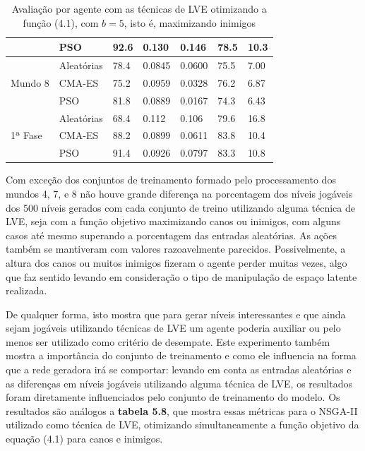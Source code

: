 \begin{table}[ht]
\begin{tabular}{|p{2cm}|p{2cm}|p{2cm}|p{2cm}|p{2cm}|p{1cm}|p{2cm}|}
        & PSO & 92.6 & 0.130 & 0.146 & 78.5 & 10.3 \\
            \hline
        &Aleatórias & 78.4 & 0.0845 & 0.0600 & 75.5 & 7.00 \\
        Mundo 8 & CMA-ES & 75.2 & 0.0959 & 0.0328 & 76.2 & 6.87 \\
        & PSO & 81.8 & 0.0889 & 0.0167 & 74.3 & 6.43 \\
            \hline
        & Aleatórias & 68.4 & 0.112 & 0.106 & 79.6 & 16.8 \\
        1ª Fase & CMA-ES & 88.2 & 0.0899 & 0.0611 & 83.8 & 10.4 \\
         & PSO & 91.4 & 0.0926 & 0.0797 & 83.3 & 10.8 \\
            \hline
    \end{tabular}
    \caption{Avaliação por agente com as técnicas de LVE otimizando a função (4.1), com $b = 5$, isto é, maximizando inimigos}
    \label{tab:inimigos_}
\end{table}

Com exceção dos conjuntos de treinamento formado pelo processamento dos mundos 4, 7, e 8 não houve grande diferença na porcentagem dos níveis jogáveis dos 500 níveis gerados com cada conjunto de treino utilizando alguma técnica de LVE, seja com a função objetivo maximizando canos ou inimigos, com alguns casos até mesmo superando a porcentagem das entradas aleatórias. As ações também se mantiveram com valores razoavelmente parecidos. Possivelmente, a altura dos canos ou muitos inimigos fizeram o agente perder muitas vezes, algo que faz sentido levando em consideração o tipo de manipulação de espaço latente realizada.

De qualquer forma, isto mostra que para gerar níveis interessantes e que ainda sejam jogáveis utilizando técnicas de LVE um agente poderia auxiliar ou pelo menos ser utilizado como critério de desempate. Este experimento também mostra a importância do conjunto de treinamento e como ele influencia na forma que a rede geradora irá se comportar: levando em conta as entradas aleatórias e as diferenças em níveis jogáveis utilizando alguma técnica de LVE, os resultados foram diretamente influenciados pelo conjunto de treinamento do modelo. Os resultados são análogos a \textbf{tabela 5.8}, que mostra essas métricas para o NSGA-II utilizado como técnica de LVE, otimizando simultaneamente a função objetivo da equação (4.1) para canos e inimigos.

